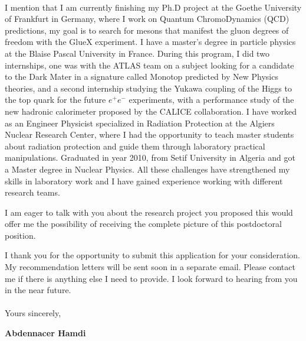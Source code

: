 \documentclass[11pt]{letter}
\begin{document}
~\par I mention that I am currently finishing my Ph.D project at the Goethe University of Frankfurt in Germany, where I work on Quantum ChromoDynamics (QCD) predictions, my goal is to search for mesons that manifest the gluon degrees of freedom with the GlueX experiment. I have a master's degree in particle physics at the Blaise Pascal University in France. During this program, I did two internships, one was with the ATLAS team on a subject looking for a candidate to the Dark Mater in a signature called Monotop predicted by New Physics theories, and a second internship studying the Yukawa coupling of the Higgs to the top quark for the future $e^{+}e^{-}$ experiments, with a performance study of the new hadronic calorimeter proposed by the CALICE collaboration. I have worked as an Engineer Physicist specialized in Radiation Protection at the Algiers Nuclear Research Center, where I had the opportunity to teach master students about radiation protection and guide them through laboratory practical manipulations. Graduated in year 2010, from Setif University in Algeria and got a Master degree in Nuclear Physics.
All these challenges have strengthened my skills in laboratory work and I have gained experience working with different research teams.
~\par I am eager to talk with you about the research project you proposed this would offer me the possibility of receiving the complete picture of this postdoctoral position.
~\par I thank you for the opportunity to submit this application for your consideration. My recommendation letters will be sent soon in a separate email. Please contact me if there is anything else I need to provide. I look forward to hearing from you in the near future.\\ \\
Yours sincerely,

\begin{flushleft}
 {\bfseries Abdennacer Hamdi}
 \end{flushleft}
 \vfill
 
\end{document}
